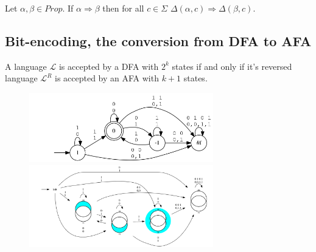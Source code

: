 \begin{lemma}
Let \(\alpha, \beta \in \mathit{Prop} \). If \( \alpha \Rightarrow \beta \) then for all
\( c \in \Sigma \) \( \Delta(\alpha, c) \Rightarrow \Delta(\beta, c) \).
\end{lemma}

\subsection{Bit-encoding, the conversion from DFA to AFA}
\begin{theorem}
 A language \( \mathcal{L} \) is accepted by a DFA with
\( 2^k \) states if and only if it's reversed language \( \mathcal{L}^R \) is
accepted by an AFA with \( k + 1 \) states.
\end{theorem}
\begin{example}
  \begin{figure}
    \includegraphics[width=8cm]{images/dfa}
    \includegraphics[width=8cm]{images/afa}
  \end{figure}
\end{example}
